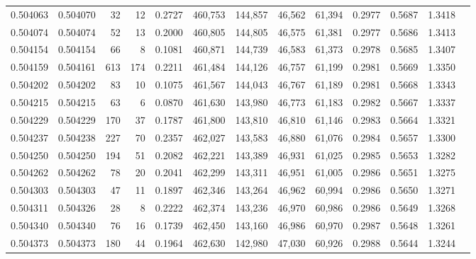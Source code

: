 \begin{tabular}{rrrrrrrrrrrrr}
0.504063 & 0.504070 &    32 &    12 &                                     0.2727 & 460,753 & 144,857 &  46,562 &  61,394 & 0.2977 & 0.5687 & 1.3418 \\
0.504074 & 0.504074 &    52 &    13 &                                     0.2000 & 460,805 & 144,805 &  46,575 &  61,381 & 0.2977 & 0.5686 & 1.3413 \\
0.504154 & 0.504154 &    66 &     8 &                                     0.1081 & 460,871 & 144,739 &  46,583 &  61,373 & 0.2978 & 0.5685 & 1.3407 \\
0.504159 & 0.504161 &   613 &   174 &                                     0.2211 & 461,484 & 144,126 &  46,757 &  61,199 & 0.2981 & 0.5669 & 1.3350 \\
0.504202 & 0.504202 &    83 &    10 &                                     0.1075 & 461,567 & 144,043 &  46,767 &  61,189 & 0.2981 & 0.5668 & 1.3343 \\
0.504215 & 0.504215 &    63 &     6 &                                     0.0870 & 461,630 & 143,980 &  46,773 &  61,183 & 0.2982 & 0.5667 & 1.3337 \\
0.504229 & 0.504229 &   170 &    37 &                                     0.1787 & 461,800 & 143,810 &  46,810 &  61,146 & 0.2983 & 0.5664 & 1.3321 \\
0.504237 & 0.504238 &   227 &    70 &                                     0.2357 & 462,027 & 143,583 &  46,880 &  61,076 & 0.2984 & 0.5657 & 1.3300 \\
0.504250 & 0.504250 &   194 &    51 &                                     0.2082 & 462,221 & 143,389 &  46,931 &  61,025 & 0.2985 & 0.5653 & 1.3282 \\
0.504262 & 0.504262 &    78 &    20 &                                     0.2041 & 462,299 & 143,311 &  46,951 &  61,005 & 0.2986 & 0.5651 & 1.3275 \\
0.504303 & 0.504303 &    47 &    11 &                                     0.1897 & 462,346 & 143,264 &  46,962 &  60,994 & 0.2986 & 0.5650 & 1.3271 \\
0.504311 & 0.504326 &    28 &     8 &                                     0.2222 & 462,374 & 143,236 &  46,970 &  60,986 & 0.2986 & 0.5649 & 1.3268 \\
0.504340 & 0.504340 &    76 &    16 &                                     0.1739 & 462,450 & 143,160 &  46,986 &  60,970 & 0.2987 & 0.5648 & 1.3261 \\
0.504373 & 0.504373 &   180 &    44 &                                     0.1964 & 462,630 & 142,980 &  47,030 &  60,926 & 0.2988 & 0.5644 & 1.3244 \\

\end{tabular}

